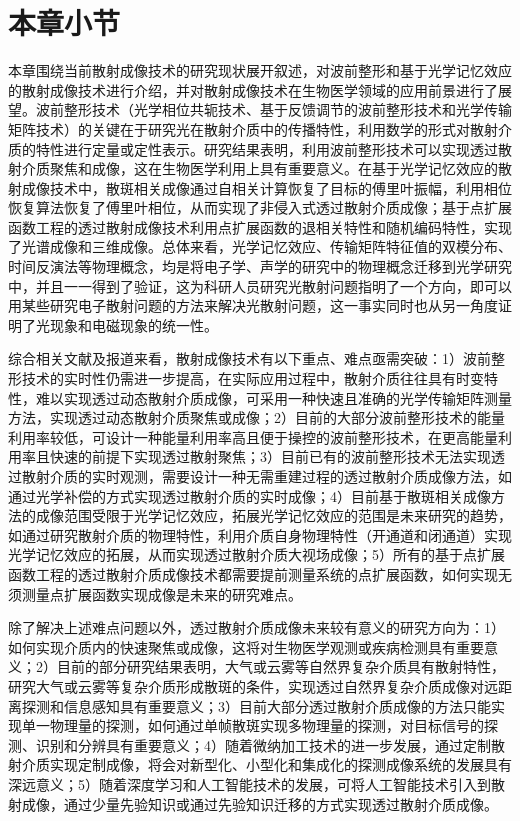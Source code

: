 \section{本章小节}

本章围绕当前散射成像技术的研究现状展开叙述，对波前整形和基于光学记忆效应的散射成像技术进行介绍，并对散射成像技术在生物医学领域的应用前景进行了展望。波前整形技术（光学相位共轭技术、基于反馈调节的波前整形技术和光学传输矩阵技术）的关键在于研究光在散射介质中的传播特性，利用数学的形式对散射介质的特性进行定量或定性表示。研究结果表明，利用波前整形技术可以实现透过散射介质聚焦和成像，这在生物医学利用上具有重要意义。在基于光学记忆效应的散射成像技术中，散斑相关成像通过自相关计算恢复了目标的傅里叶振幅，利用相位恢复算法恢复了傅里叶相位，从而实现了非侵入式透过散射介质成像；基于点扩展函数工程的透过散射成像技术利用点扩展函数的退相关特性和随机编码特性，实现了光谱成像和三维成像。总体来看，光学记忆效应、传输矩阵特征值的双模分布、时间反演法等物理概念，均是将电子学、声学的研究中的物理概念迁移到光学研究中，并且一一得到了验证，这为科研人员研究光散射问题指明了一个方向，即可以用某些研究电子散射问题的方法来解决光散射问题，这一事实同时也从另一角度证明了光现象和电磁现象的统一性。

综合相关文献及报道来看，散射成像技术有以下重点、难点亟需突破：1）波前整形技术的实时性仍需进一步提高，在实际应用过程中，散射介质往往具有时变特性，难以实现透过动态散射介质成像，可采用一种快速且准确的光学传输矩阵测量方法，实现透过动态散射介质聚焦或成像；2）目前的大部分波前整形技术的能量利用率较低，可设计一种能量利用率高且便于操控的波前整形技术，在更高能量利用率且快速的前提下实现透过散射聚焦；3）目前已有的波前整形技术无法实现透过散射介质的实时观测，需要设计一种无需重建过程的透过散射介质成像方法，如通过光学补偿的方式实现透过散射介质的实时成像；4）目前基于散斑相关成像方法的成像范围受限于光学记忆效应，拓展光学记忆效应的范围是未来研究的趋势，如通过研究散射介质的物理特性，利用介质自身物理特性（开通道和闭通道）实现光学记忆效应的拓展，从而实现透过散射介质大视场成像；5）所有的基于点扩展函数工程的透过散射介质成像技术都需要提前测量系统的点扩展函数，如何实现无须测量点扩展函数实现成像是未来的研究难点。

除了解决上述难点问题以外，透过散射介质成像未来较有意义的研究方向为：1）如何实现介质内的快速聚焦或成像，这将对生物医学观测或疾病检测具有重要意义；2）目前的部分研究结果表明，大气或云雾等自然界复杂介质具有散射特性，研究大气或云雾等复杂介质形成散斑的条件，实现透过自然界复杂介质成像对远距离探测和信息感知具有重要意义；3）目前大部分透过散射介质成像的方法只能实现单一物理量的探测，如何通过单帧散斑实现多物理量的探测，对目标信号的探测、识别和分辨具有重要意义；4）随着微纳加工技术的进一步发展，通过定制散射介质实现定制成像，将会对新型化、小型化和集成化的探测成像系统的发展具有深远意义；5）随着深度学习和人工智能技术的发展，可将人工智能技术引入到散射成像，通过少量先验知识或通过先验知识迁移的方式实现透过散射介质成像。

